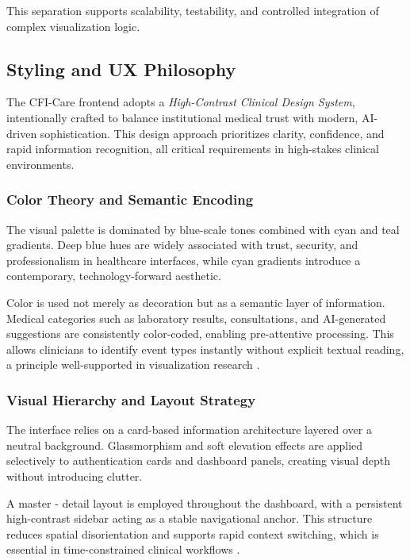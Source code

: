 \documentclass{article}
\begin{document}
This separation supports scalability, testability, and controlled integration
of complex visualization logic.

\subsection{Styling and UX Philosophy}
\label{subsec:styling}

The CFI-Care frontend adopts a \textit{High-Contrast Clinical Design System},
intentionally crafted to balance institutional medical trust with modern,
AI-driven sophistication. This design approach prioritizes clarity, confidence,
and rapid information recognition, all critical requirements in high-stakes
clinical environments.

\subsubsection{Color Theory and Semantic Encoding}

The visual palette is dominated by blue-scale tones combined with cyan and teal
gradients. Deep blue hues are widely associated with trust, security, and
professionalism in healthcare interfaces, while cyan gradients introduce a
contemporary, technology-forward aesthetic.

Color is used not merely as decoration but as a semantic layer of information.
Medical categories such as laboratory results, consultations, and AI-generated
suggestions are consistently color-coded, enabling pre-attentive processing.
This allows clinicians to identify event types instantly without explicit
textual reading, a principle well-supported in visualization research
\cite{hospitalDashboards2022,interactiveDashboards2020}.

\subsubsection{Visual Hierarchy and Layout Strategy}

The interface relies on a card-based information architecture layered over a
neutral background. Glassmorphism and soft elevation effects are applied
selectively to authentication cards and dashboard panels, creating visual depth
without introducing clutter.

A master - detail layout is employed throughout the dashboard, with a
persistent high-contrast sidebar acting as a stable navigational anchor. This
structure reduces spatial disorientation and supports rapid context switching,
which is essential in time-constrained clinical workflows
\cite{patientSafetyDashboards2021}.
\end{document}
